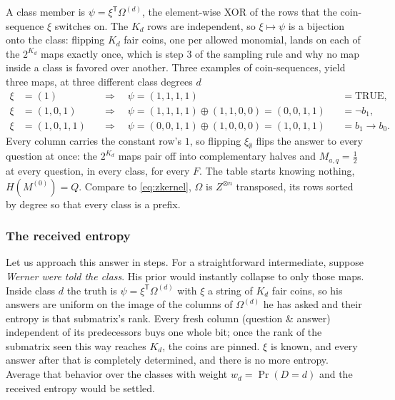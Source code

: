 \documentclass[11pt]{article}
\begin{document}
\begin{example}
\begin{center}
\begin{tikzpicture}
\end{tikzpicture}
\end{center}
%
A class member is $\psi = \xi^{\mathsf T}\Omega^{(d)}$, the element-wise XOR of the
rows that the coin-sequence $\xi$ switches on. The $K_d$ rows are
independent, so $\xi \mapsto \psi$ is a bijection onto the class:
flipping $K_d$ fair coins, one per allowed monomial, lands on each of
the $2^{K_d}$ maps exactly once, which is step 3 of the sampling rule
and why no map inside a class is favored over another. 
Three examples of coin-sequences, yield three maps, at three different class degrees $d$
%
\begin{align*}
  \xi &= (1)
    &&\Rightarrow\quad \psi = (1,1,1,1)
    &&= \mathrm{TRUE}, \\
  \xi &= (1,0,1)
    &&\Rightarrow\quad \psi = (1,1,1,1) \oplus (1,1,0,0) = (0,0,1,1)
    &&= \lnot b_1, \\
  \xi &= (1,0,1,1)
    &&\Rightarrow\quad \psi = (0,0,1,1) \oplus (1,0,0,0) = (1,0,1,1)
    &&= b_1 \to b_0 .
\end{align*}
%
Every column carries the constant row's $1$, so flipping
$\xi_\emptyset$ flips the answer to every question at once: the
$2^{K_d}$ maps pair off into complementary halves and
$M_{a,q} = \tfrac12$ at every question, in every class, for every $F$.
The table starts knowing nothing, $H(M^{(0)}) = Q$. Compare to
\eqref{eq:zkernel}, $\Omega$ is $Z^{\otimes n}$ transposed, its rows
sorted by degree so that every class is a prefix.
\end{example}

\subsubsection{The received entropy}

Let us approach this answer in steps.  
For a straightforward intermediate, suppose \emph{Werner
were told the class}. His prior would instantly collapse to only those maps. 
Inside class $d$ the truth is $\psi = \xi^{\mathsf T}\Omega^{(d)}$ with $\xi$ a string of $K_d$ fair coins,
so his answers are uniform on the image of the columns of $\Omega^{(d)}$ he has asked
and their entropy is that submatrix's rank. Every fresh column (question \& answer)
independent of its predecessors buys one whole bit; once the rank of the 
submatrix seen this way reaches $K_d$, the coins are pinned. 
$\xi$ is known, and every answer
after that is completely determined, and there is no more entropy. Average that behavior over
the classes with weight $w_d = \Pr(D = d)$ and the received entropy
would be settled.
\end{document}
